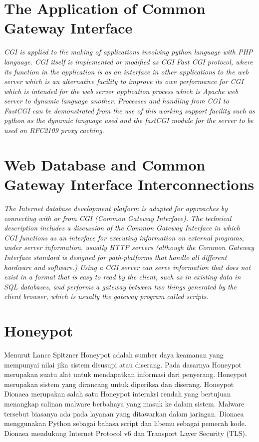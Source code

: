 \section{The Application of Common Gateway Interface }
\textit {CGI is applied to the making of applications involving python language with PHP language. CGI itself is implemented or modified as CGI Fast CGI protocol, where its function in the application is as an interface in other applications to the web server which is an alternative facility to improve its own performance for CGI which is intended for the web server application process which is Apache web server to dynamic language another. Processes and handling from CGI to FastCGI can be demonstrated from the use of this working support facility such as python as the dynamic language used and the fastCGI module for the server to be used on RFC2109 proxy caching}\cite{kridoyono2017optimasi}.


\section{ Web Database and Common Gateway Interface Interconnections }
\textit {The Internet database development platform is adapted for approaches by connecting with or from CGI (Common Gateway Interface). The technical description includes a discussion of the Common Gateway Interface in which CGI functions as an interface for executing information on external programs, under server information, usually HTTP servers (although the Common Gateway Interface standard is designed for path-platforms that handle all different hardware and software.) Using a CGI server can serve information that does not exist in a format that is easy to read by the client, such as in existing data in SQL databases, and performs a gateway between two things generated by the client browser, which is usually the gateway program called scripts}.


\section{Honeypot}
Menurut Lance Spitzner Honeypot adalah sumber daya keamanan yang mempunyai nilai jika sistem disusupi atau diserang. Pada dasarnya Honeypot merupakan suatu alat untuk mendapatkan informasi dari penyerang. Honeypot merupakan sistem yang dirancang untuk diperiksa dan diserang.
Honeypot Dionaea merupakan salah satu Honeypot interaksi rendah yang bertujuan menangkap salinan malware berbahaya yang masuk ke dalam sistem. Malware tersebut biasanya ada pada layanan yang ditawarkan dalam jaringan. Dionaea menggunakan Python sebagai bahasa script dan libemu sebagai pemecah kode. Dionaea mendukung Internet Protocol v6 dan Transport Layer Security (TLS)\cite{andros2015implementasi}.

